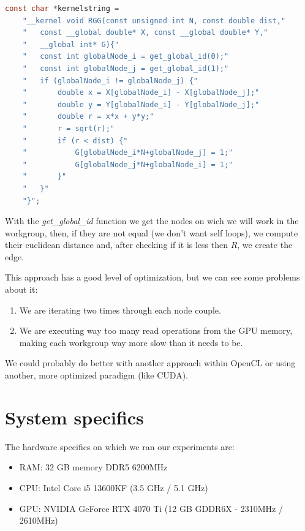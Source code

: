 \documentclass[titlepage]{article}
\begin{document}
\begin{minipage}{\linewidth}
\begin{lstlisting}[language=C, style=customc, breaklines=true]
const char *kernelstring =
    "__kernel void RGG(const unsigned int N, const double dist,"
    "   const __global double* X, const __global double* Y,"
    "   __global int* G){"
    "   const int globalNode_i = get_global_id(0);"
    "   const int globalNode_j = get_global_id(1);"
    "   if (globalNode_i != globalNode_j) {"
    "       double x = X[globalNode_i] - X[globalNode_j];"
    "       double y = Y[globalNode_i] - Y[globalNode_j];"
    "       double r = x*x + y*y;"
    "       r = sqrt(r);"
    "       if (r < dist) {"
    "           G[globalNode_i*N+globalNode_j] = 1;"
    "           G[globalNode_j*N+globalNode_i] = 1;"
    "       }"
    "   }"
    "}";
\end{lstlisting}
\end{minipage}

With the \textit{get\_global\_id} function we get the nodes on wich we will work in the workgroup, then, if they are not equal (we don't want self loops), we compute their euclidean distance and, after checking if it is less then $R$, we create the edge.

This approach has a good level of optimization, but we can see some problems about it:
\begin{enumerate}
    \item We are iterating two times through each node couple.
    \item We are executing way too many read operations from the GPU memory, making each workgroup way more slow than it needs to be.
\end{enumerate}

We could probably do better with another approach within OpenCL or using another, more optimized paradigm (like CUDA).

\section{System specifics}
The hardware specifics on which we ran our experiments are:
\begin{itemize}
    \item RAM: 32 GB memory DDR5 6200MHz
    \item CPU: Intel Core i5 13600KF (3.5 GHz / 5.1 GHz)
    \item GPU: NVIDIA GeForce RTX 4070 Ti (12 GB GDDR6X - 2310MHz / 2610MHz)
\end{itemize}
\end{document}
